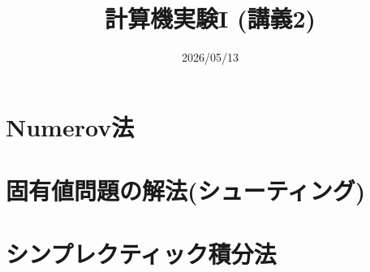 \documentclass[10pt,dvipdfmx]{beamer}
\title{計算機実験I (講義2)}
\date{2026/05/13}
\begin{document}
\begin{frame}
  \titlepage
  \tableofcontents
\end{frame}



\section{Numerov法}





\section{固有値問題の解法(シューティング)}




\section{シンプレクティック積分法}






% 
% 
% 





\section{}

\end{document}
